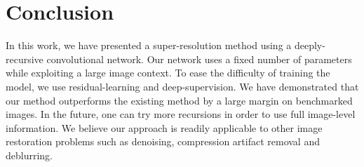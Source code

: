 \documentclass[10pt,twocolumn,letterpaper]{article}
\begin{document}
%
%
\section{Conclusion}
In this work, we have presented a super-resolution method using a deeply-recursive convolutional network. Our network uses a fixed number of parameters while exploiting a large image context. To ease the difficulty of training the model, we use residual-learning and deep-supervision. We have demonstrated that our method outperforms the existing method by a large margin on benchmarked images. In the future, one can try more recursions in order to use full image-level information. We believe our approach is readily applicable to other image restoration problems such as denoising, compression artifact removal and deblurring.

{\small
	
	
}
\end{document}

